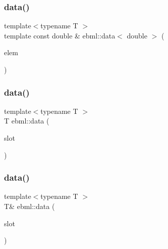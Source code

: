\mbox{\label{namespaceebml_ac78bf9d3ced3b11fedcb6172849b2cfc}} 
\subsubsection{\texorpdfstring{data()}{data()}\hspace{0.1cm}{\footnotesize\ttfamily [3/5]}}
{\footnotesize\ttfamily template$<$typename T $>$ \\
template const double \& ebml\+::data$<$ double $>$ (\begin{DoxyParamCaption}\item[{const \mbox{\hyperlink{namespaceebml_a2deef4e8071531b32e3533f1bf978917}{c\+\_\+ebml\+Element\+\_\+sp}} \&}]{elem }\end{DoxyParamCaption})}

\mbox{\label{namespaceebml_a766ff55857f1018516a926913abc8a83}} 
\subsubsection{\texorpdfstring{data()}{data()}\hspace{0.1cm}{\footnotesize\ttfamily [4/5]}}
{\footnotesize\ttfamily template$<$typename T $>$ \\
T ebml\+::data (\begin{DoxyParamCaption}\item[{const \mbox{\hyperlink{classebml_1_1const__slot__t}{const\+\_\+slot\+\_\+t}} \&}]{slot }\end{DoxyParamCaption})}

\mbox{\label{namespaceebml_ad2539ebb0462e9038828f80590adf688}} 
\subsubsection{\texorpdfstring{data()}{data()}\hspace{0.1cm}{\footnotesize\ttfamily [5/5]}}
{\footnotesize\ttfamily template$<$typename T $>$ \\
T\& ebml\+::data (\begin{DoxyParamCaption}\item[{\mbox{\hyperlink{classebml_1_1slot__t}{slot\+\_\+t}} \&}]{slot }\end{DoxyParamCaption})}

